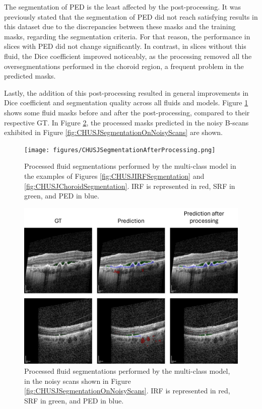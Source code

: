 \par
The segmentation of PED is the least affected by the post-processing. It was previously stated that the segmentation of PED did not reach satisfying results in this dataset due to the discrepancies between these masks and the training masks, regarding the segmentation criteria. For that reason, the performance in slices with PED did not change significantly. In contrast, in slices without this fluid, the Dice coefficient improved noticeably, as the processing removed all the oversegmentations performed in the choroid region, a frequent problem in the predicted masks.
\par
Lastly, the addition of this post-processing resulted in general improvements in Dice coefficient and segmentation quality across all fluids and models. Figure \ref{fig:CHUSJSegmentationAfterProcessing} shows some fluid masks before and after the post-processing, compared to their respective GT. In Figure \ref{fig:CHUSJSegmentationAfterProcessingNoisyScans}, the processed masks predicted in the noisy B-scans exhibited in Figure \ref{fig:CHUSJSegmentationOnNoisyScans} are shown.

\begin{figure}[!ht]
	\centering	\texttt{[image: figures/CHUSJSegmentationAfterProcessing.png]}
	\caption{Processed fluid segmentations performed by the multi-class model in the examples of Figures \ref{fig:CHUSJIRFSegmentation} and \ref{fig:CHUSJChoroidSegmentation}. IRF is represented in red, SRF in green, and PED in blue.}
	\label{fig:CHUSJSegmentationAfterProcessing}
\end{figure}

\begin{figure}[!ht]
	\centering	\includegraphics[width=1.0\linewidth]{figures/CHUSJSegmentationAfterProcessingNoisyScans.png}
	\caption{Processed fluid segmentations performed by the multi-class model, in the noisy scans shown in Figure \ref{fig:CHUSJSegmentationOnNoisyScans}. IRF is represented in red, SRF in green, and PED in blue.}
	\label{fig:CHUSJSegmentationAfterProcessingNoisyScans}
\end{figure}

